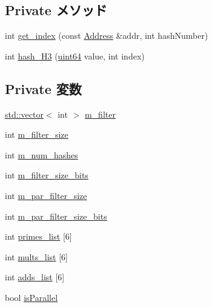 \subsection*{Private メソッド}
\begin{DoxyCompactItemize}
\item 
int \hyperlink{classH3BloomFilter_a4e668c45847b52c4595b4c5c5f7fd8d0}{get\_\-index} (const \hyperlink{classAddress}{Address} \&addr, int hashNumber)
\item 
int \hyperlink{classH3BloomFilter_aa179f17d2bcd7c5f737f76269c080610}{hash\_\-H3} (\hyperlink{TypeDefines_8hh_a29940ae63ec06c9998bba873e25407ad}{uint64} value, int index)
\end{DoxyCompactItemize}
\subsection*{Private 変数}
\begin{DoxyCompactItemize}
\item 
\hyperlink{classstd_1_1vector}{std::vector}$<$ int $>$ \hyperlink{classH3BloomFilter_aae3fd71ce4b5e8910aa63829ba6abd41}{m\_\-filter}
\item 
int \hyperlink{classH3BloomFilter_af53abddc4707ab403450239a6e94c486}{m\_\-filter\_\-size}
\item 
int \hyperlink{classH3BloomFilter_af7541b7da6a403e38b057b6a87b45be5}{m\_\-num\_\-hashes}
\item 
int \hyperlink{classH3BloomFilter_a5c26703945ae76ff80ec6951cccea29c}{m\_\-filter\_\-size\_\-bits}
\item 
int \hyperlink{classH3BloomFilter_ac7811fb42f6c367903485a7c0c686d28}{m\_\-par\_\-filter\_\-size}
\item 
int \hyperlink{classH3BloomFilter_a3d9d1bb83f31a4494f3247207e98cabd}{m\_\-par\_\-filter\_\-size\_\-bits}
\item 
int \hyperlink{classH3BloomFilter_a4b46818f030c83dec3f833b5882a6ef6}{primes\_\-list} \mbox{[}6\mbox{]}
\item 
int \hyperlink{classH3BloomFilter_a318639d0e1158ee41a59e8766465d799}{mults\_\-list} \mbox{[}6\mbox{]}
\item 
int \hyperlink{classH3BloomFilter_af57c4cc9a789293582400c57fe73915e}{adds\_\-list} \mbox{[}6\mbox{]}
\item 
bool \hyperlink{classH3BloomFilter_ae60d0e7ab765c8e6b2155c6841da8875}{isParallel}
\end{DoxyCompactItemize}


